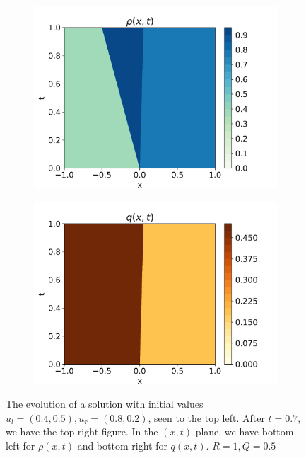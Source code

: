 \documentclass[10pt]{article}
\numberwithin{equation}{section}
\begin{document}
\begin{figure}
\begin{subfigure}[b]{0.35\textwidth}
         \includegraphics[width=\textwidth]{Figures/Model/Plots/SysContactsRho.png}
     \end{subfigure}
     \begin{subfigure}[b]{0.35\textwidth}
         \centering
         \includegraphics[width=\textwidth]{Figures/Model/Plots/SysContactsQ.png}
     \end{subfigure}
        \caption{The evolution of a solution with initial values $u_l = (0.4, 0.5 ), u_r = (0.8, 0.2)$, seen to the top left. After $t = 0.7$, we have the top right figure. In the $(x,t)$-plane, we have bottom left for $\rho(x,t)$ and bottom right for $q(x,t)$. $R = 1, Q = 0.5$}
        \label{fig:ExampleSysContact}

\end{figure}
\end{document}

